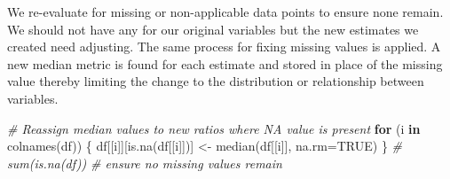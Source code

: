 \documentclass[
]{article}
\newenvironment{Shaded}{\begin{snugshade}}{\end{snugshade}}
\newcommand{\AttributeTok}[1]{\textcolor[rgb]{0.77,0.63,0.00}{#1}}
\newcommand{\CommentTok}[1]{\textcolor[rgb]{0.56,0.35,0.01}{\textit{#1}}}
\newcommand{\ConstantTok}[1]{\textcolor[rgb]{0.00,0.00,0.00}{#1}}
\newcommand{\ControlFlowTok}[1]{\textcolor[rgb]{0.13,0.29,0.53}{\textbf{#1}}}
\newcommand{\DecValTok}[1]{\textcolor[rgb]{0.00,0.00,0.81}{#1}}
\newcommand{\FloatTok}[1]{\textcolor[rgb]{0.00,0.00,0.81}{#1}}
\newcommand{\FunctionTok}[1]{\textcolor[rgb]{0.00,0.00,0.00}{#1}}
\newcommand{\NormalTok}[1]{#1}
\newcommand{\OtherTok}[1]{\textcolor[rgb]{0.56,0.35,0.01}{#1}}
\newcommand{\SpecialCharTok}[1]{\textcolor[rgb]{0.00,0.00,0.00}{#1}}
\begin{document}
\begin{Shaded}
\end{Shaded}

We re-evaluate for missing or non-applicable data points to ensure none
remain. We should not have any for our original variables but the new
estimates we created need adjusting. The same process for fixing missing
values is applied. A new median metric is found for each estimate and
stored in place of the missing value thereby limiting the change to the
distribution or relationship between variables.

\begin{Shaded}
\begin{Highlighting}[]
\CommentTok{\# Reassign median values to new ratios where NA value is present}
\ControlFlowTok{for}\NormalTok{ (i }\ControlFlowTok{in} \FunctionTok{colnames}\NormalTok{(df)) \{}
\NormalTok{  df[[i]][}\FunctionTok{is.na}\NormalTok{(df[[i]])] }\OtherTok{\textless{}{-}} \FunctionTok{median}\NormalTok{(df[[i]], }\AttributeTok{na.rm=}\ConstantTok{TRUE}\NormalTok{)}
\NormalTok{\}}
\CommentTok{\# sum(is.na(df)) \# ensure no missing values remain}
\end{Highlighting}
\end{Shaded}
\end{document}
